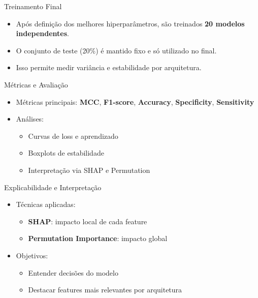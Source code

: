 \documentclass[10pt]{beamer}
\begin{document}
\begin{frame}{Treinamento Final}
  \begin{itemize}
    \item Após definição dos melhores hiperparâmetros, são treinados \textbf{20 modelos independentes}.
    \item O conjunto de teste (20\%) é mantido fixo e só utilizado no final.
    \item Isso permite medir variância e estabilidade por arquitetura.
  \end{itemize}
\end{frame}

\begin{frame}{Métricas e Avaliação}
  \begin{itemize}
  \item Métricas principais:
  \textbf{MCC}, \textbf{F1-score}, \textbf{Accuracy}, \textbf{Specificity}, \textbf{Sensitivity}
  \item Análises:
  \begin{itemize}
    \item Curvas de loss e aprendizado
    \item Boxplots de estabilidade
    \item Interpretação via SHAP e Permutation
  \end{itemize}
\end{itemize}
\end{frame}

\begin{frame}{Explicabilidade e Interpretação}
\begin{itemize}
  \item Técnicas aplicadas:
  \begin{itemize}
    \item \textbf{SHAP}: impacto local de cada feature
    \item \textbf{Permutation Importance}: impacto global
  \end{itemize}

  \item Objetivos:
  \begin{itemize}
    \item Entender decisões do modelo
    \item Destacar features mais relevantes por arquitetura
  \end{itemize}
\end{itemize}
\end{frame}
\end{document}
